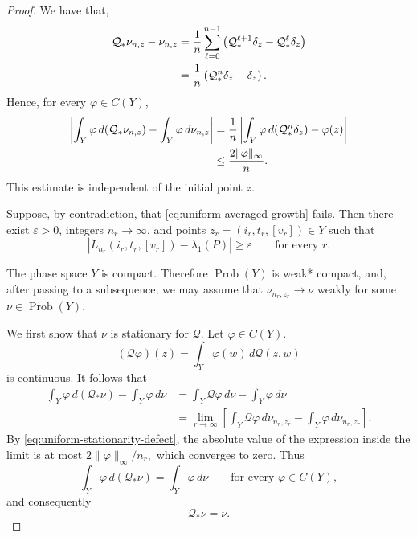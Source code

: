 \documentclass[11pt,a4paper]{amsart}
\newcommand{\Prob}{\operatorname{Prob}}
\begin{document}
\begin{proof}
We have that, 
\begin{align}
 \mathcal Q_*\nu_{n,z}-\nu_{n,z}
 &=
 \frac1n
 \sum_{\ell=0}^{n-1}
 \left(
 \mathcal Q^{\ell+1}_*\delta_z
 -
 \mathcal Q^\ell_*\delta_z
 \right)
 \notag\\
 &=
 \frac1n
 \left(
 \mathcal Q^n_*\delta_z-\delta_z
 \right).
 \label{eq:occupation-stationarity-defect}
\end{align}
Hence, for every \(\varphi\in C(Y)\),
\begin{align}
 \left|
 \int_Y\varphi\,d(\mathcal Q_*\nu_{n,z})
 -
 \int_Y\varphi\,d\nu_{n,z}
 \right|
 &=
 \frac1n
 \left|
 \int_Y\varphi\,d(\mathcal Q^n_*\delta_z)
 -
 \varphi(z)
 \right|
 \notag\\
 &\leq
 \frac{2\|\varphi\|_\infty}{n}.
 \label{eq:uniform-stationarity-defect}
\end{align}
This estimate is independent of the initial point \(z\).

Suppose, by contradiction, that
\eqref{eq:uniform-averaged-growth} fails.  Then there exist
\(\varepsilon>0\), integers \(n_r\to\infty\), and points $ z_r=(i_r,t_r,[v_r])\in Y$ such that
\begin{equation}\label{eq:failure-of-uniform-growth}
 \left|
 L_{n_r}(i_r,t_r,[v_r])-\lambda_1(P)
 \right|
 \geq\varepsilon
 \qquad\text{for every }r.
\end{equation}

The phase space \(Y\) is compact.  Therefore \(\Prob(Y)\) is
weak* compact, and, after passing to a subsequence, we may assume
that $ \nu_{n_r,z_r}\longrightarrow\nu$ weakly for some \(\nu\in\Prob(Y)\).

We first show that \(\nu\) is stationary for \(\mathcal Q\).  Let
\(\varphi\in C(Y)\). %
\[
 (\mathcal Q\varphi)(z)
 =
 \int_Y\varphi(w)\,d\mathcal Q(z,w)
\]
is continuous.  It follows that
\begin{align*}
 \int_Y\varphi\,d(\mathcal Q_*\nu)
 -
 \int_Y\varphi\,d\nu
 &=
 \int_Y\mathcal Q\varphi\,d\nu
 -
 \int_Y\varphi\,d\nu
 \\
 &=
 \lim_{r\to\infty}
 \left[
 \int_Y\mathcal Q\varphi\,d\nu_{n_r,z_r}
 -
 \int_Y\varphi\,d\nu_{n_r,z_r}
 \right].
\end{align*}
By \eqref{eq:uniform-stationarity-defect}, the absolute value of the
expression inside the limit is at most
$ 2\|\varphi\|_\infty/{n_r},
$
which converges to zero.  Thus
\[
 \int_Y\varphi\,d(\mathcal Q_*\nu)
 =
 \int_Y\varphi\,d\nu
 \qquad
 \text{for every }\varphi\in C(Y),
\]
and consequently
\[
 \mathcal Q_*\nu=\nu.
\]


\end{proof}
\end{document}
